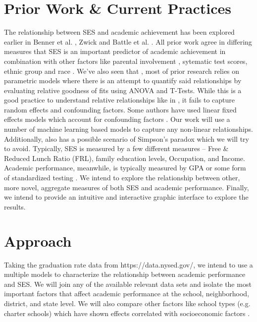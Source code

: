\documentclass[sigconf,nonacm,11pt]{acmart}
\begin{document}
\section{Prior Work \& Current Practices}
The relationship between SES and academic achievement has been explored earlier in Benner et al. \cite{parentalinvolvement}, Zwick \cite{collegescores} and Battle et al. \cite{raceses}. All prior work agree in differing measures that SES is an important predictor of academic achievement in combination with other factors like parental involvement \cite{parentalinvolvement}, sytematic test scores, ethnic group \cite{collegescores} and race \cite{raceses}. We've also seen that \cite{parentalinvolvement, collegescores, raceses, farooq}, most of prior research relies on parametric models where there is an attempt to quantify said relationships by evaluating relative goodness of fits using ANOVA and T-Tests. While this is a good practice to understand relative relationships like in \cite{collegescores, raceses}, it fails to capture random effects and confounding factors. Some authors have used linear fixed effects models which account for confounding factors \cite{winters, jinnai}. Our work will use a number of machine learning based models to capture any non-linear relationships. Additionally, \cite{collegescores} also has a possible scenario of Simpson's paradox which we will try to avoid. Typically, \cite{sirin} SES is measured by a few different measures -- Free \& Reduced Lunch Ratio (FRL), family education levels, Occupation, and Income.  Academic performance, meanwhile, is typically measured by GPA or some form of standardized testing \cite{sirin}.  We intend to explore the relationship between other, more novel, aggregate measures of both SES and academic performance. Finally, we intend to provide an intuitive and interactive graphic interface to explore the results.

\section{Approach}
Taking the graduation rate data from https://data.nysed.gov/, we intend to use a multiple models to characterize the relationship between academic performance and SES.  We will join any of the available relevant data sets and isolate the most important factors that affect academic performance at the school, neighborhood, district, and state level. We will also compare other factors like school types (e.g. charter schools) which have shown effects correlated with socioeconomic factors \cite{west}.
\end{document}
